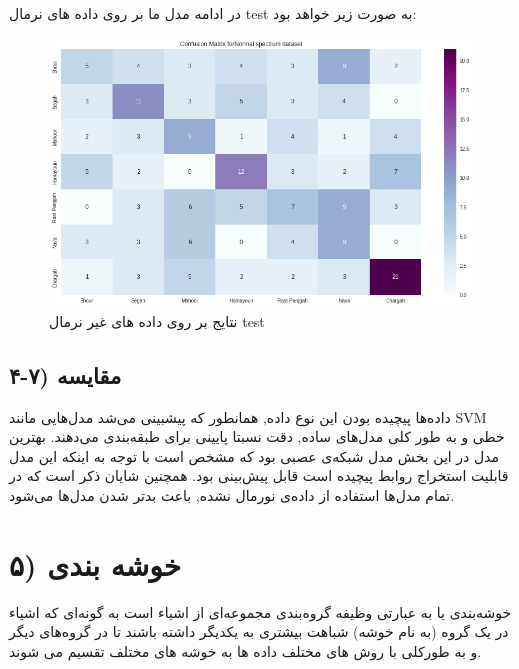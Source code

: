 \documentclass{article}
\begin{document}
در ادامه مدل ما بر روی داده های نرمال test به صورت زیر خواهد بود:\newline
\begin{figure}[h]
	\centering
	\includegraphics[width=0.7\linewidth]{Photo/45}
	\caption[نتایج  بر روی داده های غیر نرمال test]{نتایج  بر روی داده های غیر نرمال test}
	\label{fig:44}
\end{figure}
\subsection{۴-۷) مقایسه}
 داده‌ها پیچیده بودن این نوع داده, همانطور که پیشبینی می‌شد مدل‌هایی مانند SVM خطی و به طور کلی مدل‌های ساده, دقت نسبتا پایینی برای طبقه‌بندی می‌دهند. بهترین مدل در این بخش مدل شبکه‌ی عصبی بود که مشخص است با توجه به اینکه این مدل قابلیت استخراج روابط پیچیده است قابل پیش‌بینی بود.
همچنین شایان ذکر است که در تمام مدل‌ها استفاده از داده‌ی نورمال نشده, باعث بدتر شدن مدل‌ها می‌شود.
\section{۵) خوشه بندی}
خوشه‌بندی یا به عبارتی  وظیفه گروه‌بندی مجموعه‌ای از اشیاء است به گونه‌ای که اشیاء در یک گروه (به نام خوشه) شباهت بیشتری به یکدیگر داشته باشند تا در گروه‌های دیگر و به طورکلی با روش های مختلف داده ها به خوشه های مختلف تقسیم می شوند.\newline
\end{document}
